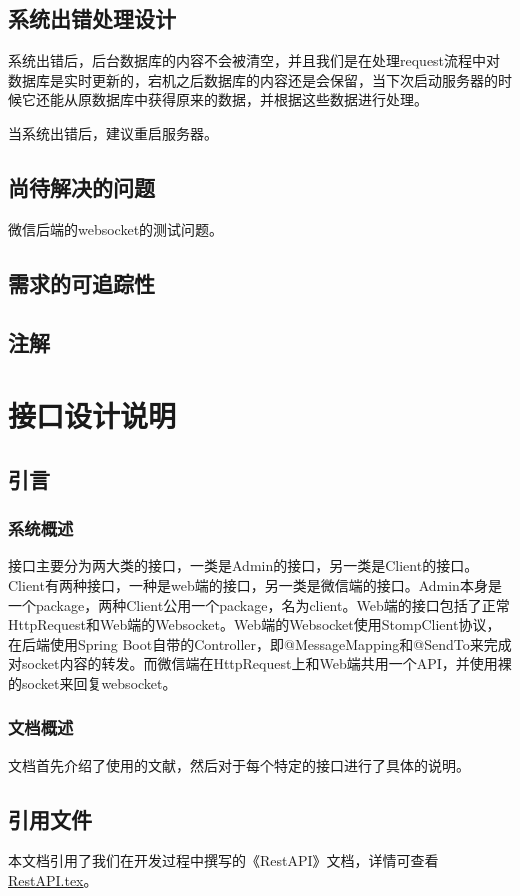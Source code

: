 \documentclass{article}
\begin{document}
		\subsection{系统出错处理设计}
			系统出错后，后台数据库的内容不会被清空，并且我们是在处理request流程中对数据库是实时更新的，宕机之后数据库的内容还是会保留，当下次启动服务器的时候它还能从原数据库中获得原来的数据，并根据这些数据进行处理。

			当系统出错后，建议重启服务器。
		\subsection{尚待解决的问题}
			微信后端的websocket的测试问题。
		\subsection{需求的可追踪性}
		\subsection{注解}

	\section{接口设计说明}
		\label{接口设计说明}
		\subsection{引言}
			\subsubsection{系统概述}
				接口主要分为两大类的接口，一类是Admin的接口，另一类是Client的接口。Client有两种接口，一种是web端的接口，另一类是微信端的接口。Admin本身是一个package，两种Client公用一个package，名为client。Web端的接口包括了正常HttpRequest和Web端的Websocket。Web端的Websocket使用StompClient协议，在后端使用Spring Boot自带的Controller，即@MessageMapping和@SendTo来完成对socket内容的转发。而微信端在HttpRequest上和Web端共用一个API，并使用裸的socket来回复websocket。
			\subsubsection{文档概述}
				文档首先介绍了使用的文献，然后对于每个特定的接口进行了具体的说明。
		\subsection{引用文件}
			本文档引用了我们在开发过程中撰写的《RestAPI》文档，详情可查看\href{https://github.com/wenj/tomatodesign/blob/master/REST%20API.tex}{RestAPI.tex}。
\end{document}
